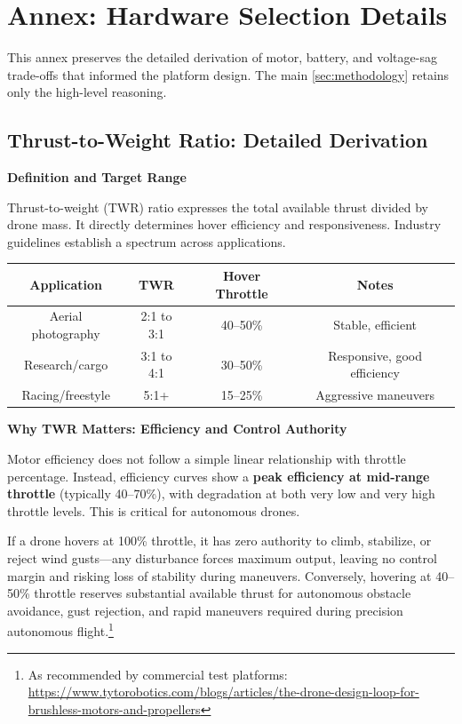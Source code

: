 \clearpage
\section{Annex: Hardware Selection Details}
\label{sec:annex_hardware}

This annex preserves the detailed derivation of motor, battery, and voltage-sag trade-offs that informed the platform design. The main \autoref{sec:methodology} retains only the high-level reasoning.

\subsection{Thrust-to-Weight Ratio: Detailed Derivation}

\textbf{Definition and Target Range}

Thrust-to-weight (TWR) ratio expresses the total available thrust divided by drone mass. It directly determines hover efficiency and responsiveness. Industry guidelines establish a spectrum across applications.\cite{bershadsky2016propulsion}

\begin{table}[h]
\centering
\begin{tabular}{|c|c|c|c|}
\hline
\textbf{Application} & \textbf{TWR} & \textbf{Hover Throttle} & \textbf{Notes} \\
\hline
Aerial photography & 2:1 to 3:1 & 40--50\% & Stable, efficient \\
\hline
Research/cargo & 3:1 to 4:1 & 30--50\% & Responsive, good efficiency \\
\hline
Racing/freestyle & 5:1+ & 15--25\% & Aggressive maneuvers \\
\hline
\end{tabular}
\end{table}

\textbf{Why TWR Matters: Efficiency and Control Authority}

Motor efficiency does not follow a simple linear relationship with throttle percentage. Instead, efficiency curves show a \textbf{peak efficiency at mid-range throttle} (typically 40--70\%), with degradation at both very low and very high throttle levels.\cite{bershadsky2016propulsion} This is critical for autonomous drones.

If a drone hovers at 100\% throttle, it has zero authority to climb, stabilize, or reject wind gusts---any disturbance forces maximum output, leaving no control margin and risking loss of stability during maneuvers.\cite{bershadsky2016propulsion} Conversely, hovering at 40--50\% throttle reserves substantial available thrust for autonomous obstacle avoidance, gust rejection, and rapid maneuvers required during precision autonomous flight.\footnote{As recommended by commercial test platforms: \url{https://www.tytorobotics.com/blogs/articles/the-drone-design-loop-for-brushless-motors-and-propellers}}

